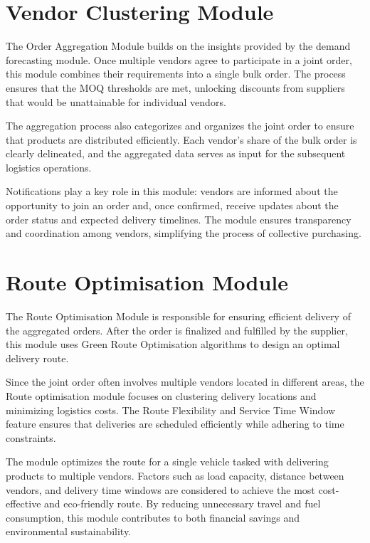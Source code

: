 \section{Vendor Clustering Module}

The Order Aggregation Module builds on the insights provided by the demand forecasting module. Once multiple vendors agree to participate in a joint order, this module combines their requirements into a single bulk order. The process ensures that the MOQ thresholds are met, unlocking discounts from suppliers that would be unattainable for individual vendors.

The aggregation process also categorizes and organizes the joint order to ensure that products are distributed efficiently. Each vendor's share of the bulk order is clearly delineated, and the aggregated data serves as input for the subsequent logistics operations.

Notifications play a key role in this module: vendors are informed about the opportunity to join an order and, once confirmed, receive updates about the order status and expected delivery timelines. The module ensures transparency and coordination among vendors, simplifying the process of collective purchasing.

\section{Route Optimisation Module}

The Route Optimisation Module is responsible for ensuring efficient delivery of the aggregated orders. After the order is finalized and fulfilled by the supplier, this module uses Green Route Optimisation algorithms to design an optimal delivery route.

Since the joint order often involves multiple vendors located in different areas, the Route optimisation module focuses on clustering delivery locations and minimizing logistics costs. The Route Flexibility and Service Time Window feature ensures that deliveries are scheduled efficiently while adhering to time constraints.

The module optimizes the route for a single vehicle tasked with delivering products to multiple vendors. Factors such as load capacity, distance between vendors, and delivery time windows are considered to achieve the most cost-effective and eco-friendly route. By reducing unnecessary travel and fuel consumption, this module contributes to both financial savings and environmental sustainability.

